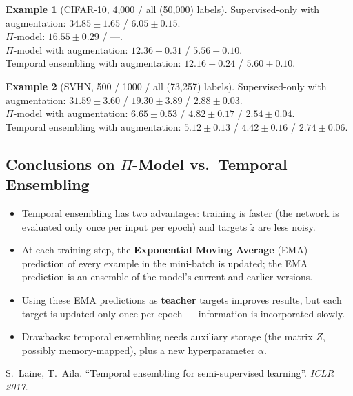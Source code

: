 \documentclass[11pt,a4paper]{article}
\theoremstyle{definition}
\newtheorem{example}{Example}[section]
\theoremstyle{plain}
\theoremstyle{remark}
\begin{document}
\begin{example}[CIFAR-10, 4{,}000 / all (50{,}000) labels]
Supervised-only with augmentation: $34.85 \pm 1.65$ / $6.05 \pm 0.15$.\\
$\Pi$-model: $16.55 \pm 0.29$ / ---. \\
$\Pi$-model with augmentation: $\mathbf{12.36 \pm 0.31}$ / $\mathbf{5.56 \pm 0.10}$.\\
Temporal ensembling with augmentation: $\mathbf{12.16 \pm 0.24}$ / $5.60 \pm 0.10$.
\end{example}

\begin{example}[SVHN, 500 / 1000 / all (73{,}257) labels]
Supervised-only with augmentation: $31.59 \pm 3.60$ / $19.30 \pm 3.89$ / $2.88 \pm 0.03$.\\
$\Pi$-model with augmentation: $6.65 \pm 0.53$ / $4.82 \pm 0.17$ / $\mathbf{2.54 \pm 0.04}$.\\
Temporal ensembling with augmentation: $\mathbf{5.12 \pm 0.13}$ / $\mathbf{4.42 \pm 0.16}$ / $2.74 \pm 0.06$.
\end{example}

\subsection{Conclusions on $\Pi$-Model vs.\ Temporal Ensembling}

\begin{itemize}
    \item Temporal ensembling has two advantages: training is faster (the network is evaluated only once per input per epoch) and targets $\widetilde{z}$ are less noisy.
    \item At each training step, the \textbf{Exponential Moving Average} (EMA) prediction of every example in the mini-batch is updated; the EMA prediction is an ensemble of the model's current and earlier versions.
    \item Using these EMA predictions as \textbf{teacher} targets improves results, but each target is updated only once per epoch --- information is incorporated slowly.
    \item Drawbacks: temporal ensembling needs auxiliary storage (the matrix $Z$, possibly memory-mapped), plus a new hyperparameter $\alpha$.
\end{itemize}

\begin{tcolorbox}[colback=blue!5!white,colframe=blue!60!black,title={Reference}]
S.\ Laine, T.\ Aila. ``Temporal ensembling for semi-supervised learning''. \textit{ICLR 2017}.
\end{tcolorbox}
\end{document}
